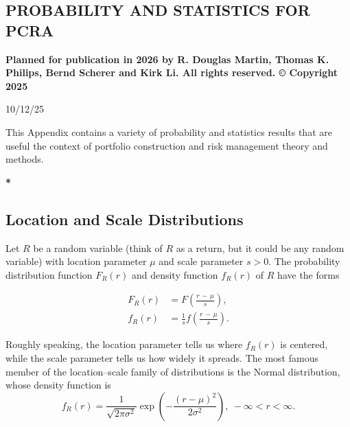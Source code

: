 \documentclass[graybox,envcountchap,sectrefs]{svmono}\usepackage[]{graphicx}\usepackage[]{xcolor}
\begin{document}
\begin{appendices}


\setcounter{chapter}{1} 

\chapter{PROBABILITY AND STATISTICS FOR PCRA\label{chap:AppendixB}}

\vspace{0.3in}

\textbf{Planned for publication in 2026 by R. Douglas Martin, Thomas
K. Philips, Bernd Scherer and Kirk Li. All rights reserved. © Copyright
2025}

\vspace{0.3in}

\begin{center}
10/12/25
\par\end{center}

\tocchpnum=30pt 
\tocsecnum=33pt 
\tocsubsecnum=40pt 
\tocsubsubsecnum=48pt 
\tocparanum=55pt 
\tocsubparanum=63pt
\calctocindent

\tableofcontents{}\newpage{}

This Appendix contains a variety of probability and statistics results
that are useful the context of portfolio construction and risk management
theory and methods.

\textbf{{*}}

\section{Location and Scale Distributions}

Let $R$ be a random variable (think of $R$ as a return, but it could
be any random variable) with location parameter $\mu$ and scale parameter
$s>0$. The probability distribution function $F_{R}(r)$ and density
function $f_{R}(r)$ of $R$ have the forms

\begin{subequations}
\begin{align}
F_{R}(r) & =F\left(\frac{r\,-\,\mu}{s}\right),\label{eq:LocScaleDistribution}\\[0.5em]
f_{R}(r) & =\frac{1}{s}f\left(\frac{r\,-\,\mu}{s}\right).\label{eq:LocScaleDensity}
\end{align}
\end{subequations}

Roughly speaking, the location parameter tells us where $f_{R}(r)$
is centered, while the scale parameter tells us how widely it spreads.
The most famous member of the location--scale family of distributions
is the Normal distribution, whose density function is
\begin{equation}
f_{R}(r)=\frac{1}{\sqrt{2\pi\sigma^{2}}}\exp\left(-\frac{\left(r-\mu\right)^{2}}{2\sigma^{2}}\right),\ -\infty<r<\infty.\label{eq:NormalDensity}
\end{equation}


\end{appendices}
\end{document}
